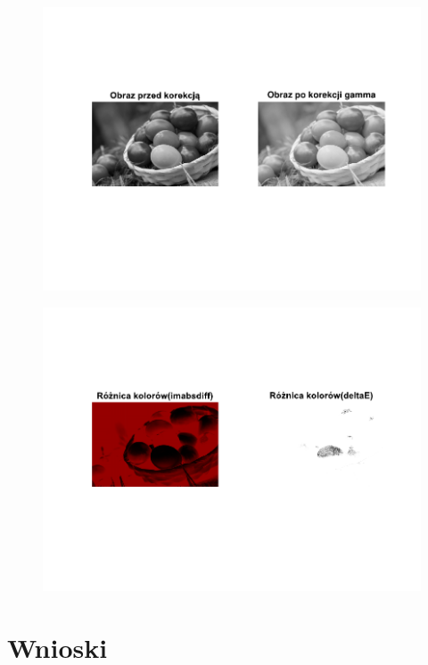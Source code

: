 \documentclass[10pt,a4paper,twoside,twocolumn]{article}%
\begin{document}
\begin{figure}[H]\centering\includegraphics[width=0.9\linewidth]{kod/my_figure19.pdf}\label{fig:my_figure19.pdf}\end{figure}

\begin{figure}[H]\centering\includegraphics[width=0.9\linewidth]{kod/my_figure20.pdf}\label{fig:my_figure20.pdf}\end{figure}

\section{Wnioski}
\end{document}

